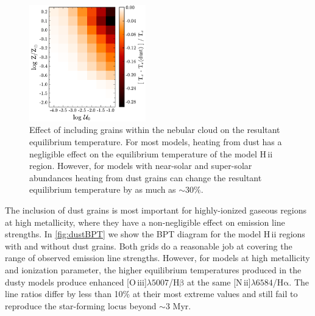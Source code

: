\documentclass[linenumbers, trackchanges, tighten]{aastex61}%
\newcommand{\Fig}[1]{\autoref{fig:#1}}
\newcommand{\nii}{[N\,{\sc ii}]\xspace}
\newcommand{\oiii}{[O\,{\sc iii}]\xspace}
\newcommand{\ha}{\ensuremath{\mathrm{H\alpha}}}
\newcommand{\hb}{\ensuremath{\mathrm{H\beta}}}
\newcommand{\hii}{H\,{\sc ii}\xspace}
\newcommand\lam[1]{\ensuremath{\lambda #1}}
\newcommand\niiha{\nii{}\lam{6584}/\ha{}}
\newcommand\oiiihb{\oiii{}\lam{5007}/\hb{}}
\begin{document}
\begin{figure}[!htbp]
  \begin{centering}
    \includegraphics[width=0.45\textwidth]{f30.pdf}
    \caption{Effect of including grains within the nebular cloud on the resultant equilibrium temperature. For most models, heating from dust has a negligible effect on the equilibrium temperature of the model \hii region. However, for models with near-solar and super-solar abundances heating from dust grains can change the resultant equilibrium temperature by as much as ${\sim}30\%$.}
    \label{fig:dustHeat}
  \end{centering}
\end{figure}

The inclusion of dust grains is most important for highly-ionized gaseous regions at high metallicity, where they have a non-negligible effect on emission line strengths. In \Fig{dustBPT} we show the BPT diagram for the model \hii regions with and without dust grains. Both grids do a reasonable job at covering the range of observed emission line strengths. However, for models at high metallicity and ionization parameter, the higher equilibrium temperatures produced in the dusty models produce enhanced \oiiihb{} at the same \niiha{}. The line ratios differ by less than 10\% at their most extreme values and still fail to reproduce the star-forming locus beyond $\sim 3$ Myr. 
\end{document}
